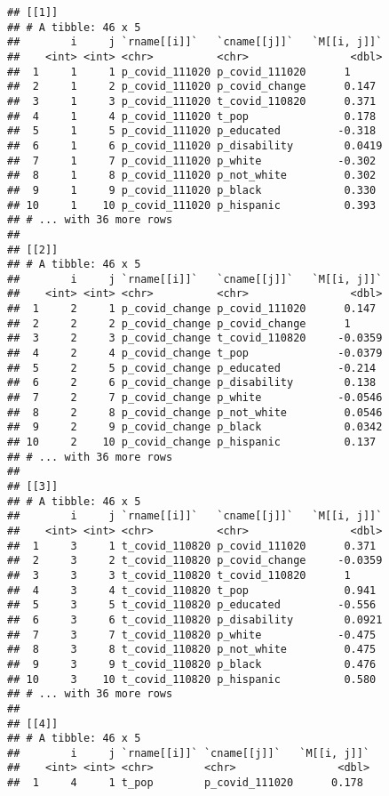 \documentclass[
]{article}
\begin{document}
\begin{verbatim}
## [[1]]
## # A tibble: 46 x 5
##        i     j `rname[[i]]`   `cname[[j]]`   `M[[i, j]]`
##    <int> <int> <chr>          <chr>                <dbl>
##  1     1     1 p_covid_111020 p_covid_111020      1     
##  2     1     2 p_covid_111020 p_covid_change      0.147 
##  3     1     3 p_covid_111020 t_covid_110820      0.371 
##  4     1     4 p_covid_111020 t_pop               0.178 
##  5     1     5 p_covid_111020 p_educated         -0.318 
##  6     1     6 p_covid_111020 p_disability        0.0419
##  7     1     7 p_covid_111020 p_white            -0.302 
##  8     1     8 p_covid_111020 p_not_white         0.302 
##  9     1     9 p_covid_111020 p_black             0.330 
## 10     1    10 p_covid_111020 p_hispanic          0.393 
## # ... with 36 more rows
## 
## [[2]]
## # A tibble: 46 x 5
##        i     j `rname[[i]]`   `cname[[j]]`   `M[[i, j]]`
##    <int> <int> <chr>          <chr>                <dbl>
##  1     2     1 p_covid_change p_covid_111020      0.147 
##  2     2     2 p_covid_change p_covid_change      1     
##  3     2     3 p_covid_change t_covid_110820     -0.0359
##  4     2     4 p_covid_change t_pop              -0.0379
##  5     2     5 p_covid_change p_educated         -0.214 
##  6     2     6 p_covid_change p_disability        0.138 
##  7     2     7 p_covid_change p_white            -0.0546
##  8     2     8 p_covid_change p_not_white         0.0546
##  9     2     9 p_covid_change p_black             0.0342
## 10     2    10 p_covid_change p_hispanic          0.137 
## # ... with 36 more rows
## 
## [[3]]
## # A tibble: 46 x 5
##        i     j `rname[[i]]`   `cname[[j]]`   `M[[i, j]]`
##    <int> <int> <chr>          <chr>                <dbl>
##  1     3     1 t_covid_110820 p_covid_111020      0.371 
##  2     3     2 t_covid_110820 p_covid_change     -0.0359
##  3     3     3 t_covid_110820 t_covid_110820      1     
##  4     3     4 t_covid_110820 t_pop               0.941 
##  5     3     5 t_covid_110820 p_educated         -0.556 
##  6     3     6 t_covid_110820 p_disability        0.0921
##  7     3     7 t_covid_110820 p_white            -0.475 
##  8     3     8 t_covid_110820 p_not_white         0.475 
##  9     3     9 t_covid_110820 p_black             0.476 
## 10     3    10 t_covid_110820 p_hispanic          0.580 
## # ... with 36 more rows
## 
## [[4]]
## # A tibble: 46 x 5
##        i     j `rname[[i]]` `cname[[j]]`   `M[[i, j]]`
##    <int> <int> <chr>        <chr>                <dbl>
##  1     4     1 t_pop        p_covid_111020      0.178 

\end{verbatim}
\end{document}
